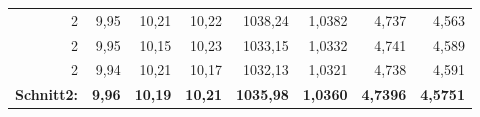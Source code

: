 \begin{table}[htbp]
\begin{tabular}{lrrrrrrr}
      \multicolumn{1}{r}{2} & 9,95  & 10,21 & 10,22 & 1038,24 & 1,0382 & 4,737 & 4,563 \\
      \multicolumn{1}{r}{2} & 9,95  & 10,15 & 10,23 & 1033,15 & 1,0332 & 4,741 & 4,589 \\
      \multicolumn{1}{r}{2} & 9,94  & 10,21 & 10,17 & 1032,13 & 1,0321 & 4,738 & 4,591 \\
      \textbf{Schnitt2:} & \textbf{9,96} & \textbf{10,19} & \textbf{10,21} & \textbf{1035,98} & \textbf{1,0360} & \textbf{4,7396} & \textbf{4,5751} \\
      \bottomrule
      \end{tabular}%
    \label{Grünteilmaße}%
  \end{table}%
  